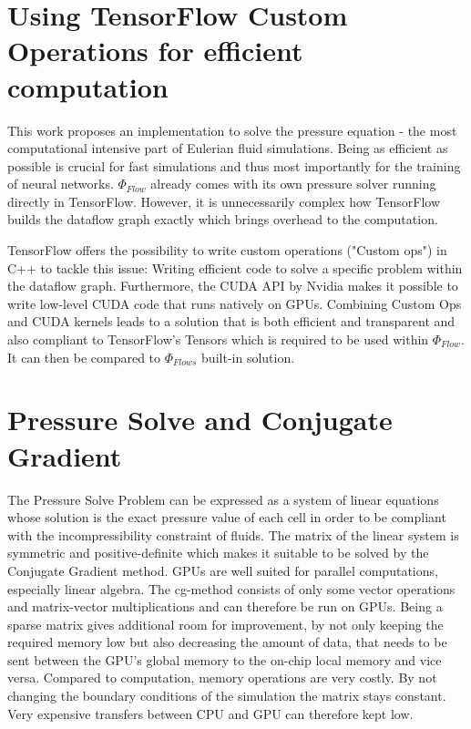 \section{Using TensorFlow Custom Operations for efficient computation}
This work proposes an implementation to solve the pressure equation - the most computational intensive part of Eulerian fluid simulations. Being as efficient as possible is crucial for fast simulations and thus most importantly for the training of neural networks. $\Phi_\textit{Flow}$ already comes with its own pressure solver running directly in TensorFlow. However, it is unnecessarily complex how TensorFlow builds the dataflow graph exactly which brings overhead to the computation.\par
TensorFlow offers the possibility to write custom operations ("Custom ops") in C++ to tackle this issue: Writing efficient code to solve a specific problem within the dataflow graph. Furthermore, the CUDA API by Nvidia makes it possible to write low-level CUDA code that runs natively on GPUs. Combining Custom Ops and CUDA kernels leads to a solution that is both efficient and transparent and also compliant to TensorFlow's Tensors which is required to be used within $\Phi_\textit{Flow}$. It can then be compared to $\Phi_\textit{Flows}$ built-in solution.
\section{Pressure Solve and Conjugate Gradient}
The Pressure Solve Problem can be expressed as a system of linear equations whose solution is the exact pressure value of each cell in order to be compliant with the incompressibility constraint of fluids. The matrix of the linear system is symmetric and positive-definite which makes it suitable to be solved by the Conjugate Gradient method. GPUs are well suited for parallel computations, especially linear algebra. The cg-method consists of only some vector operations and matrix-vector multiplications and can therefore be run on GPUs. Being a sparse matrix gives additional room for improvement, by not only keeping the required memory low but also decreasing the amount of data, that needs to be sent between the GPU's global memory to the on-chip local memory and vice versa. Compared to computation, memory operations are very costly. By not changing the boundary conditions of the simulation the matrix stays constant. Very expensive transfers between CPU and GPU can therefore kept low.